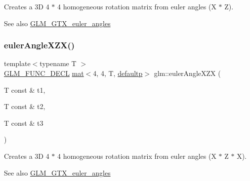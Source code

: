 Creates a 3D 4 $\ast$ 4 homogeneous rotation matrix from euler angles (X $\ast$ Z). \begin{DoxySeeAlso}{See also}
\hyperlink{group__gtx__euler__angles}{G\+L\+M\+\_\+\+G\+T\+X\+\_\+euler\+\_\+angles} 
\end{DoxySeeAlso}
\mbox{\label{group__gtx__euler__angles_ga60171c79a17aec85d7891ae1d1533ec9}} 
\subsubsection{\texorpdfstring{euler\+Angle\+X\+Z\+X()}{eulerAngleXZX()}}
{\footnotesize\ttfamily template$<$typename T $>$ \\
\hyperlink{setup_8hpp_ab2d052de21a70539923e9bcbf6e83a51}{G\+L\+M\+\_\+\+F\+U\+N\+C\+\_\+\+D\+E\+CL} \hyperlink{structglm_1_1mat}{mat}$<$4, 4, T, \hyperlink{namespaceglm_a36ed105b07c7746804d7fdc7cc90ff25a9d21ccd8b5a009ec7eb7677befc3bf51}{defaultp}$>$ glm\+::euler\+Angle\+X\+ZX (\begin{DoxyParamCaption}\item[{T const \&}]{t1,  }\item[{T const \&}]{t2,  }\item[{T const \&}]{t3 }\end{DoxyParamCaption})}

Creates a 3D 4 $\ast$ 4 homogeneous rotation matrix from euler angles (X $\ast$ Z $\ast$ X). \begin{DoxySeeAlso}{See also}
\hyperlink{group__gtx__euler__angles}{G\+L\+M\+\_\+\+G\+T\+X\+\_\+euler\+\_\+angles} 
\end{DoxySeeAlso}
\mbox{\label{group__gtx__euler__angles_ga996dce12a60d8a674ba6737a535fa910}} 
